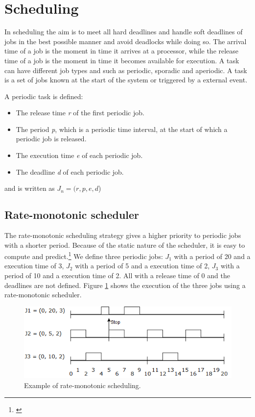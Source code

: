 \section{Scheduling} \label{sc:scheduling}
In scheduling the aim is to meet all hard deadlines and handle soft deadlines of jobs in the best possible manner and avoid deadlocks while doing so. The arrival time of a job is the moment in time it arrives at a processor, while the release time of a job is the moment in time it becomes available for execution. A task can have different job types and such as periodic, sporadic and aperiodic. A task is a set of jobs known at the start of the system or triggered by a external event.

A periodic task is defined:
\begin{itemize}
	\itemsep0em
	\item The release time \textit{r} of the first periodic job.
	\item The period \textit{p}, which is a periodic time interval, at the start of which a periodic job is released.
	\item The execution time \textit{e} of each periodic job.
	\item The deadline \textit{d} of each periodic job.
\end{itemize}
and is written as $J_n=(r,p,e,d$)

\subsection{Rate-monotonic scheduler}
The rate-monotonic scheduling strategy gives a higher priority to periodic jobs with a shorter period. Because of the static nature of the scheduler, it is easy to compute and predict.\footnote{\cite[p.~183]{Fokkink1965}}
We define three periodic jobs: $J_1$ with a period of 20 and a execution time of 3, $J_2$ with a period of 5 and a execution time of 2, $J_3$ with a period of 10 and a execution time of 2. All with a release time of 0 and the deadlines are not defined. Figure \ref{fig:rateMonotonicExample} shows the execution of the three jobs using a rate-monotonic scheduler.

\begin{figure}[!ht]
	\centering
	\includegraphics[scale=0.5]{realTimeComputing/fig/rate-mono.png}
	\caption{Example of rate-monotonic scheduling.}
	\label{fig:rateMonotonicExample}
\end{figure}

